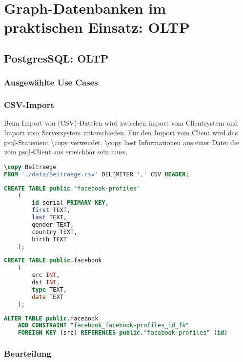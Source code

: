 \chapter{Graph-Datenbanken im praktischen Einsatz: OLTP}
\section{PostgresSQL: OLTP}
\subsection{Ausgewählte Use Cases}
\subsection{CSV-Import}
Beim Import von (CSV)-Dateien wird zwischen import vom Clientsystem und  Import vom Serversystem unterschieden. 
Für den Import vom Client wird das psql-Statement \textbackslash copy verwendet. \textbackslash copy liest Informationen aus einer Datei die vom psql-Client aus erreichbar sein muss. \cite{postgres2018}

\begin{lstlisting}[language=SQL,caption=CSV Input,frame=single]
\copy Beitraege 
FROM './data/Beitraege.csv' DELIMITER ',' CSV HEADER;
\end{lstlisting}


\begin{lstlisting}[language=SQL,caption=Anlegen der Tabelle facebook-profiles,frame=single]
    CREATE TABLE public."facebook-profiles"
    (
        id serial PRIMARY KEY,
        first TEXT,
        last TEXT,
        gender TEXT,
        country TEXT,
        birth TEXT
    );
\end{lstlisting}
\newpage
\begin{lstlisting}[language=SQL,caption=Anlegen der Tabelle facebook,frame=single]
    CREATE TABLE public.facebook
    (
        src INT,
        dst INT,
        type TEXT,
        date TEXT
    );
\end{lstlisting}

\begin{lstlisting}[language=SQL,caption=Hinzufügen von Fremdschlüsseln,frame=single]
    ALTER TABLE public.facebook
    ADD CONSTRAINT "facebook_facebook-profiles_id_fk"
    FOREIGN KEY (src) REFERENCES public."facebook-profiles" (id)
\end{lstlisting}

\subsection{Beurteilung}
